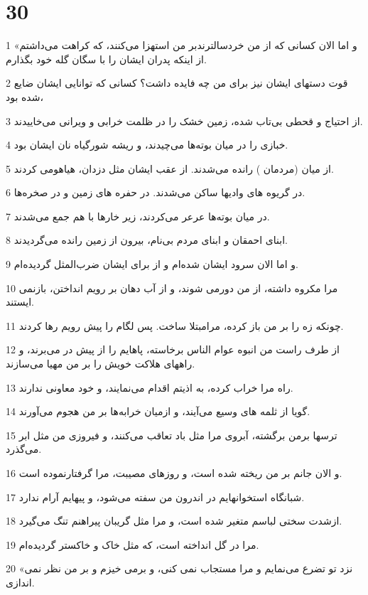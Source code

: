 \chapter{30}

\par 1 «و اما الان کسانی که از من خردسالترندبر من استهزا می‌کنند، که کراهت می‌داشتم از اینکه پدران ایشان را با سگان گله خود بگذارم.
\par 2 قوت دستهای ایشان نیز برای من چه فایده داشت؟ کسانی که توانایی ایشان ضایع شده بود،
\par 3 از احتیاج و قحطی بی‌تاب شده، زمین خشک را در ظلمت خرابی و ویرانی می‌خاییدند.
\par 4 خبازی را در میان بوته‌ها می‌چیدند، و ریشه شورگیاه نان ایشان بود.
\par 5 از میان (مردمان ) رانده می‌شدند. از عقب ایشان مثل دزدان، هیاهومی کردند.
\par 6 در گریوه های وادیها ساکن می‌شدند. در حفره های زمین و در صخره‌ها.
\par 7 در میان بوته‌ها عرعر می‌کردند، زیر خارها با هم جمع می‌شدند.
\par 8 ابنای احمقان و ابنای مردم بی‌نام، بیرون از زمین رانده می‌گردیدند.
\par 9 و اما الان سرود ایشان شده‌ام و از برای ایشان ضرب‌المثل گردیده‌ام.
\par 10 مرا مکروه داشته، از من دورمی شوند، و از آب دهان بر رویم انداختن، بازنمی ایستند.
\par 11 چونکه زه را بر من باز کرده، مرامبتلا ساخت. پس لگام را پیش رویم رها کردند.
\par 12 از طرف راست من انبوه عوام الناس برخاسته، پاهایم را از پیش در می‌برند، و راههای هلاکت خویش را بر من مهیا می‌سازند.
\par 13 راه مرا خراب کرده، به اذیتم اقدام می‌نمایند، و خود معاونی ندارند.
\par 14 گویا از ثلمه های وسیع می‌آیند، و ازمیان خرابه‌ها بر من هجوم می‌آورند.
\par 15 ترسها برمن برگشته، آبروی مرا مثل باد تعاقب می‌کنند، و فیروزی من مثل ابر می‌گذرد.
\par 16 و الان جانم بر من ریخته شده است، و روزهای مصیبت، مرا گرفتارنموده است.
\par 17 شبانگاه استخوانهایم در اندرون من سفته می‌شود، و پیهایم آرام ندارد.
\par 18 ازشدت سختی لباسم متغیر شده است، و مرا مثل گریبان پیراهنم تنگ می‌گیرد. 
\par 19 مرا در گل انداخته است، که مثل خاک و خاکستر گردیده‌ام.
\par 20 «نزد تو تضرع می‌نمایم و مرا مستجاب نمی کنی، و برمی خیزم و بر من نظر نمی اندازی.
